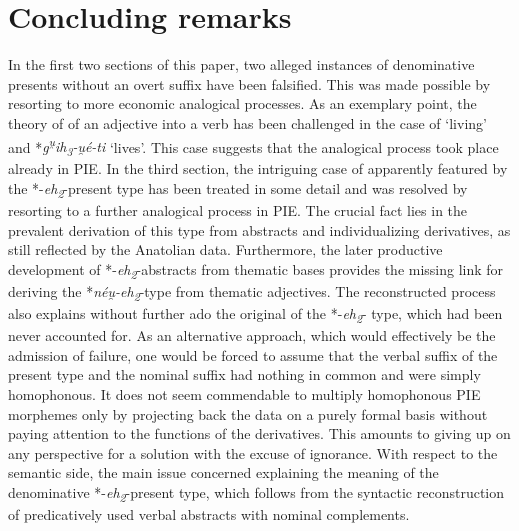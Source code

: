\documentclass[output=paper,colorlinks,citecolor=brown]{langscibook}
\begin{document}
\section{Concluding remarks}

In the first two sections of this paper, two alleged instances of denominative presents without an overt suffix have been falsified. This was made possible by resorting to more economic analogical processes. As an exemplary point, the theory of  of an adjective into a verb has been challenged in the case of  ‘living’ and  *\textit{g\textsuperscript{u̯}ih\textsubscript{3}-u̯é-ti} ‘lives’. This case suggests that the analogical process took place already in PIE. In the third section, the intriguing case of  apparently featured by the  *-\textit{eh\textsubscript{2}}-present type has been treated in some detail and was resolved by resorting to a further analogical process in PIE. The crucial fact lies in the prevalent derivation of this  type from abstracts and individualizing derivatives, as still reflected by the Anatolian data. Furthermore, the later productive development of *-\textit{eh\textsubscript{2}}-abstracts from thematic  bases provides the missing link for deriving the *\textit{néu̯-eh\textsubscript{2}}-type from thematic adjectives. The reconstructed process also explains without further ado the original  of the *-\textit{eh\textsubscript{2}}- type, which had been never accounted for. As an alternative approach, which would effectively be the admission of failure, one would be forced to assume that the verbal suffix  of the present type and the nominal suffix  had nothing in common and were simply homophonous. It does not seem commendable to multiply homophonous PIE morphemes only by projecting back the data on a purely formal basis without paying attention to the functions of the derivatives. This amounts to giving up on any perspective for a solution with the excuse of ignorance. With respect to the semantic side, the main issue concerned explaining the  meaning of the denominative *-\textit{eh\textsubscript{2}}-present type, which follows from the syntactic reconstruction of predicatively used verbal abstracts with nominal complements.  
\end{document}
